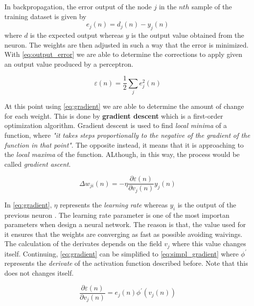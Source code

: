 \noindent In backpropagation, the error output of the node $j$ in the $nth$ sample of the training dataset is given by
\begin{equation}
    e_{j}(n) = d_{j}(n) - y_{j}(n)
\end{equation}
where $d$ is the expected output whereas $y$ is the output value obtained from the neuron. The weights are then adjusted in such a way that the error is minimized. With \ref{eq:output_error} we are able to determine the corrections to apply given an output value produced by a perceptron.

\begin{equation}\label{eq:output_error}
    \varepsilon (n) = \frac{1}{2}\sum_{j} e^2_{j}(n)
\end{equation}

\noindent At this point using \ref{eq:gradient} we are able to determine the amount of change for each weight. This is done by \textbf{gradient descent} which is a first-order optimization algorithm. Gradient descent is used to find \textit{local minima} of a function, where \textit{"it takes steps proportionally to the negative of the gradient of the function in that point"}\cite{gradient_wiki}. The opposite instead, it means that it is approaching to the \textit{local maxima} of the function. ALthough, in this way, the process would be called \textit{gradient ascent}\cite{gradient_wiki}.

\begin{equation}\label{eq:gradient}
    \Delta w_{ji}(n) = -\eta \frac{\partial \varepsilon (n)}{\partial v_{j} (n)}y_{j}(n)
\end{equation}

\noindent In \ref{eq:gradient}, $\eta$ represents the \textit{learning rate} whereas $y_{i}$ is the output of the previous neuron \cite{mlp_wiki}. The learning rate parameter is one of the most importan parameters when design a neural network. The reason is that, the value used for it ensures that the weights are converging as fast as possible avoiding waivings. \\

\noindent The calculation of the derivates depends on the field $v_{j}$ where this value changes itself. Continuing, \ref{eq:gradient} can be simplified to \ref{eq:simpl_gradient} where $\phi^{\prime}$ represents the \textit{derivate} of the activation function described before. Note that this does not changes itself.

\begin{equation}\label{eq:simpl_gradient}
    \frac{\partial \varepsilon (n)}{\partial v_{j} (n)} = e_{j}(n)\phi^{\prime}(v_{j}(n))
\end{equation}
